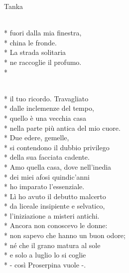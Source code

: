 \documentclass[12pt]{book}
\begin{document}
\begin{poem}{Tanka}{}

\settowidth{\versewidth}{non meno è ciò che meriti.}

\begin{altverse}
\\*
fuori dalla mia finestra,\\*
china le fronde.\\*
La strada solitaria\\*
ne raccoglie il profumo.\\*
\end{altverse}


\end{poem}

\begin{poem}{}{}

\settowidth{\versewidth}{non meno è ciò che meriti.}

\begin{altverse}
\\*
il tuo ricordo. Travagliato\\*
dalle inclemenze del tempo,\\*
quello è una vecchia casa\\*
nella parte più antica del mio cuore.\\*
Due edere, gemelle,\\*
si contendono il dubbio privilego\\*
della sua facciata cadente.\\*
Amo quella casa, dove nell'inedia\\*
dei miei afosi quindic'anni\\*
ho imparato l'essenziale.\\*
Lì ho avuto il debutto malcerto\\*
da liceale insipiente e selvatico,\\*
l'iniziazione a misteri antichi.\\*
Ancora non conoscevo le donne:\\*
non sapevo che hanno un buon odore;\\*
né che il grano matura al sole\\*
e solo a luglio lo si coglie\\*
- così Proserpina vuole -.
\end{altverse}


\end{poem}
\end{document}
